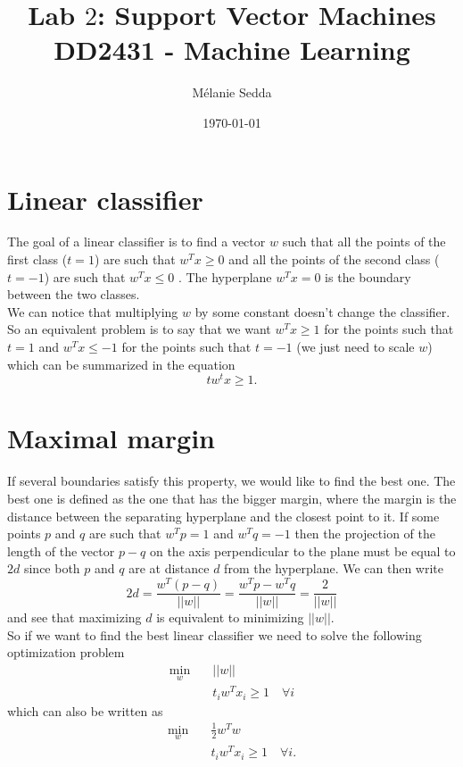 \documentclass{article}
\title{Lab $2$: Support Vector Machines\\
\large{DD2431 - Machine Learning}}
\date{\today}
\author{Mélanie Sedda}
\begin{document}
\maketitle

\section{Linear classifier}
The goal of a linear classifier is to find a vector $w$ such that all the points of the first class ($t = 1$) are such that $w^Tx \geq 0$ and all the points of the second class ($t = -1$) are such that $w^Tx \leq 0$ . The hyperplane $w^Tx = 0$ is the boundary between the two classes.\\

We can notice that multiplying $w$ by some constant doesn't change the classifier. So an equivalent problem is to say that we want $w^Tx \geq 1$ for the points such that $t = 1$ and $w^Tx \leq -1$ for the points such that $t = -1$ (we just need to scale $w$) which can be summarized in the equation $$tw^tx \geq 1.$$ 

\section{Maximal margin}
If several boundaries satisfy this property, we would like to find the best one. The best one is defined as the one that has the bigger margin, where the margin is the distance between the separating hyperplane and the closest point to it. If some points $p$ and $q$ are such that $w^Tp = 1$ and $w^Tq = -1$ then the projection of the length of the vector $p-q$ on the axis perpendicular to the plane must be equal to $2d$ since both $p$ and $q$ are at distance $d$ from the hyperplane. We can then write
$$2d = \frac{w^T(p-q)}{||w||} = \frac{w^Tp-w^Tq}{||w||} = \frac{2}{||w||}$$
and see that maximizing $d$ is equivalent to minimizing $||w||$.\\

So if we want to find the best linear classifier we need to solve the following optimization problem
\begin{align*}
\min_{w}\quad &||w|| \\
&t_iw^Tx_i \geq 1 \quad \forall i
\end{align*}
which can also be written as
\begin{align}
\min_{w}\quad &\frac{1}{2} w^Tw \\
&t_iw^Tx_i \geq 1 \quad \forall i  \nonumber.
\label{primal}
\end{align}
\end{document}

